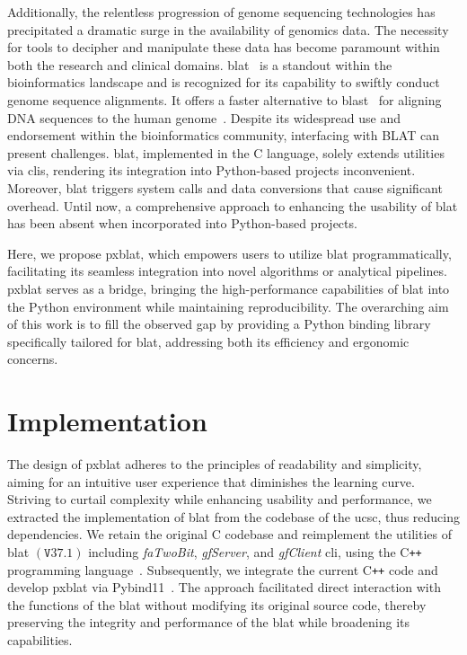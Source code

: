 \documentclass[unnumsec,webpdf,contemporary,large,namedate]{oup-authoring-template}%
\theoremstyle{thmstyleone}%
\theoremstyle{thmstyletwo}%
\theoremstyle{thmstylethree}%
\begin{document}
Additionally, the relentless progression of genome sequencing technologies has precipitated a dramatic surge in the availability of genomics data.
The necessity for tools to decipher and manipulate these data has become paramount within both the research and clinical domains.
\gls{blat}~\citep{kent2002blat} is a standout within the bioinformatics landscape and is recognized for its capability to swiftly conduct genome sequence alignments.
It offers a faster alternative to \gls{blast}~\citep{altschul1990basic} for aligning DNA sequences to the human genome~\citep{kent2002blat}.
Despite its widespread use and endorsement within the bioinformatics community, interfacing with BLAT can present challenges.
\gls{blat}, implemented in the C language, solely extends utilities via \glspl{cli}, rendering its integration into Python-based projects inconvenient.
Moreover, \gls{blat} triggers system calls and data conversions that cause significant overhead.
Until now, a comprehensive approach to enhancing the usability of \gls{blat} has been absent when incorporated into Python-based projects.

Here, we propose \gls{pxblat}, which empowers users to utilize \gls{blat} programmatically, facilitating its seamless integration into novel algorithms or analytical pipelines.
\gls{pxblat} serves as a bridge, bringing the high-performance capabilities of \gls{blat} into the Python environment while maintaining reproducibility.
The overarching aim of this work is to fill the observed gap by providing a Python binding library specifically tailored for \gls{blat}, addressing both its efficiency and ergonomic concerns.


\section{Implementation}\label{sec:implementation}

The design of \gls{pxblat} adheres to the principles of readability and simplicity, aiming for an intuitive user experience that diminishes the learning curve.
Striving to curtail complexity while enhancing usability and performance, we extracted the implementation of \gls{blat} from the codebase of the \gls{ucsc}, thus reducing dependencies.
We retain the original C codebase and reimplement the utilities of \gls{blat} \(\left(\mathtt{V}37.1\right)\) including \emph{faTwoBit}, \emph{gfServer}, and \emph{gfClient} \gls{cli}, using the C\texttt{++} programming language~\citep{kent2002blat}.
Subsequently, we integrate the current C\texttt{++} code and develop \gls{pxblat} via Pybind11~\citep{pybind11}.
The approach facilitated direct interaction with the functions of the \gls{blat} without modifying its original source code, thereby preserving the integrity and performance of the \gls{blat} while broadening its capabilities.
\end{document}
